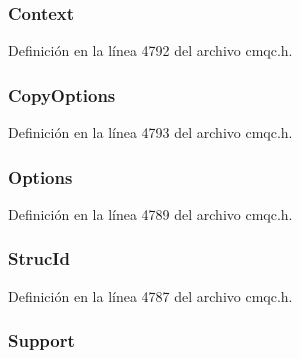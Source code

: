 \subsubsection[{Context}]{ Context}\label{structtag_m_q_p_d_ae02ee8a9bc114b5315e104f8b7d6249a}


Definición en la línea 4792 del archivo cmqc.\+h.

\hypertarget{structtag_m_q_p_d_a64944f1782a83f9e73e9a7bdbd7b5544}{}
\subsubsection[{Copy\+Options}]{ Copy\+Options}\label{structtag_m_q_p_d_a64944f1782a83f9e73e9a7bdbd7b5544}


Definición en la línea 4793 del archivo cmqc.\+h.

\hypertarget{structtag_m_q_p_d_ad7aff2d6c6044809464380998d24ec5c}{}
\subsubsection[{Options}]{ Options}\label{structtag_m_q_p_d_ad7aff2d6c6044809464380998d24ec5c}


Definición en la línea 4789 del archivo cmqc.\+h.

\hypertarget{structtag_m_q_p_d_a0530922ca944569b52601d74941f96e4}{}
\subsubsection[{Struc\+Id}]{ Struc\+Id}\label{structtag_m_q_p_d_a0530922ca944569b52601d74941f96e4}


Definición en la línea 4787 del archivo cmqc.\+h.

\hypertarget{structtag_m_q_p_d_af5d5b2a40b10005006c5584e02c61796}{}
\subsubsection[{Support}]{ Support}\label{structtag_m_q_p_d_af5d5b2a40b10005006c5584e02c61796}


